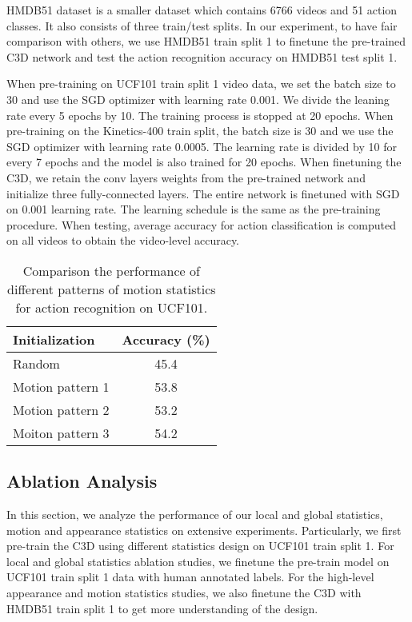 \documentclass[10pt,twocolumn,letterpaper]{article}
\begin{document}
HMDB51 dataset \cite{kuehne2011hmdb} is a smaller dataset which contains 6766 videos and 51 action classes. It also consists of three train/test splits. In our experiment, to have fair comparison with others, we use HMDB51 train split 1 to finetune the pre-trained C3D network and test the action recognition accuracy on HMDB51 test split 1.


 When pre-training on UCF101 train split 1 video data, we set the batch size to 30 and use the SGD optimizer with learning rate 0.001. We divide the leaning rate every 5 epochs by 10. The training process is stopped at 20 epochs. When pre-training on the Kinetics-400 train split, the batch size is 30 and we use the SGD optimizer with learning rate 0.0005. The learning rate is divided by 10 for every 7 epochs and the model is also trained for 20 epochs. When finetuning the C3D, we retain the conv layers weights from the pre-trained network and initialize three fully-connected layers. The entire network is finetuned with SGD on 0.001 learning rate. The learning schedule is the same as the pre-training procedure. When testing, average accuracy for action classification is computed on all videos to obtain the video-level accuracy.

\begin{table}[t]
\caption{Comparison the performance of different patterns of motion statistics for action recognition on UCF101.}
\vspace{-6pt}
\begin{center}
\begin{tabular}{lc}
\hline
Initialization & Accuracy (\%) \\
\hline
Random & 45.4 \\
Motion pattern 1 & 53.8 \\
Motion pattern 2 & 53.2 \\
Moiton pattern 3 & 54.2\\
\hline
\end{tabular}
\end{center}\vspace{-7mm}
\label{pattern}
\end{table}

\subsection{Ablation Analysis}
In this section, we analyze the performance of our local and global statistics, motion and appearance statistics on extensive experiments. Particularly, we first pre-train the C3D using different statistics design on UCF101 train split 1. For local and global statistics ablation studies, we finetune the pre-train model on UCF101 train split 1 data with human annotated labels. For the high-level appearance and motion statistics studies, we also finetune the C3D with HMDB51 train split 1 to get more understanding of the design.
\end{document}
